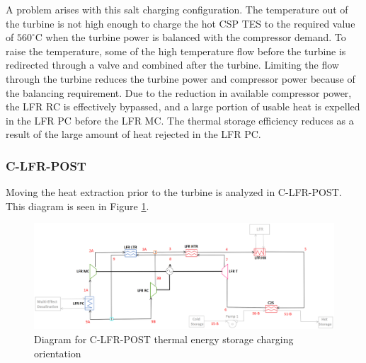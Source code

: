 \begin{paracol}{2}
\linenumbers
\switchcolumn

A problem arises with this salt charging configuration. The temperature out of the turbine is not high enough to charge the hot CSP TES to the required value of $560^{\circ}$C when the turbine power is balanced with the compressor demand. To raise the temperature, some of the high temperature flow before the turbine is redirected through a valve and combined after the turbine. Limiting the flow through the turbine reduces the turbine power and compressor power because of the balancing requirement. Due to the reduction in available compressor power, the LFR RC is effectively bypassed, and a large portion of usable heat is expelled in the LFR PC before the LFR MC. The thermal storage efficiency reduces as a result of the large amount of heat rejected in the LFR PC. 



\subsubsection{C-LFR-POST} 

Moving the heat extraction prior to the turbine is analyzed in C-LFR-POST. This diagram is seen in Figure \ref{c-lfr-post}.

\end{paracol}
\begin{figure}[H]
    \widefigure
    \includegraphics[width=\linewidth]{Definitions/c-lfr-post.pdf}
    \caption{Diagram for C-LFR-POST thermal energy storage charging orientation\label{c-lfr-post}}
\end{figure}
